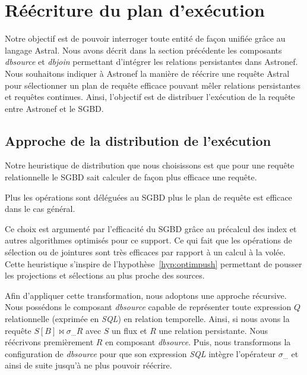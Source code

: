 \section{Réécriture du plan d'exécution}\label{sec:contrib:asteroid:reecriture}
Notre objectif est de pouvoir interroger toute entité de façon unifiée grâce au langage Astral. Nous avons décrit dans la section précédente les composants \textit{dbsource} et \textit{dbjoin} permettant d'intégrer les relations persistantes dans Astronef. Nous souhaitons indiquer à Astronef la manière de réécrire une requête Astral pour sélectionner un plan de requête efficace pouvant mêler relations persistantes et requêtes continues. Ainsi, l'objectif est de distribuer l'exécution de la requête entre Astronef et le SGBD.

\subsection{Approche de la distribution de l'exécution}
Notre heuristique de distribution que nous choisissons est que pour une requête relationnelle le SGBD sait calculer de façon plus efficace une requête.

\begin{hyp}\label{hyp:sgbd}
    Plus les opérations sont déléguées au SGBD plus le plan de requête est efficace dans le cas général.
\end{hyp}

Ce choix est argumenté par l'efficacité du SGBD grâce au précalcul des index et autres algorithmes optimisés pour ce support. Ce qui fait que les opérations de sélection ou de jointures sont très efficaces par rapport à un calcul à la volée. Cette heuristique s'inspire de l'hypothèse~\ref{hyp:optimpush} permettant de pousser les projections et sélections au plus proche des sources.

Afin d'appliquer cette transformation, nous adoptons une approche récursive. Nous possédons le composant \textit{dbsource} capable de représenter toute expression $Q$ relationnelle (exprimée en \textit{SQL}) en relation temporelle. Ainsi, si nous avons la requête $S[B] \Join \sigma_{...} R$ avec $S$ un flux et $R$ une relation persistante. Nous réécrivons premièrement $R$ en composant \textit{dbsource}. Puis, nous transformons la configuration de \textit{dbsource} pour que son expression \textit{SQL} intègre l'opérateur $\sigma_{...}$ et ainsi de suite jusqu'à ne plus pouvoir réécrire.

